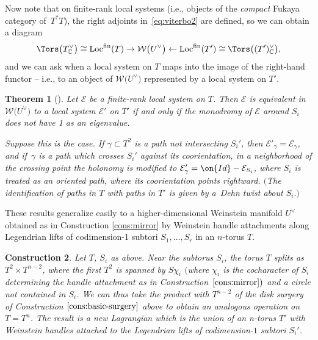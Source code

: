 \documentclass[10pt,a4paper]{amsart}
\numberwithin{equation}{section}
\newtheorem{Theorem}{Theorem}[section]
\newtheorem{Construction}[Theorem]{Construction}
\def\CC{\mathbb{C}}
\def\cW{\mathcal{W}}
\def\cE{\mathcal{E}}
\newcommand\Loc{\textup{Loc}}
\begin{document}
Now note that on finite-rank local systems (i.e., objects of the {\em compact} Fukaya category of~$T^*T$), the right adjoints in~\eqref{eq:viterbo2} are defined, so we can obtain a diagram
\begin{equation}
 \Tors\big(T^\vee_\CC\big)\cong\Loc^{\rm fin}(T)\to \cW\big(U^\vee\big)\gets\Loc^{\rm fin}(T')\cong \Tors\big( (T')^\vee_\CC\big),
\label{eq:viterbo-adj}
\end{equation}
and we can ask when a local system on $T$ maps into the image of the right-hand functor -- i.e., to an object of $\cW\big(U^\vee\big)$ represented by a local system on $T'$.

\begin{Theorem}[{\cite[Theorem 4.16]{STW}}]\label{thm:stw-birational}
 Let $\cE$ be a finite-rank local system on $T$. Then $\cE$ is equivalent in $\cW\big(U^\vee\big)$ to a local system $\cE'$ on $T'$ if and only if the monodromy of $\cE$ around $S_i$ does not have 1 as an eigenvalue.

 Suppose this is the case. If $\gamma\subset T^2$ is a path not intersecting $S_i'$, then $\cE'_\gamma=\cE_\gamma$, and if~$\gamma$ is a path which crosses $S_i'$ against its coorientation, in a neighborhood of the crossing point the holonomy is modified to $\cE'_\gamma = \on{Id}-\cE_{S_i}$, where $S_i$ is treated as an oriented path, where its coorientation points rightward. $($The identification of paths in $T$ with paths in $T'$ is given by a~Dehn twist about $S_i.)$
\end{Theorem}

These results generalize easily to a higher-dimensional Weinstein manifold $U^\vee$ obtained as in Construction \ref{cons:mirror} by Weinstein handle attachments along Legendrian lifts of codimension-1 subtori $S_1,\dots,S_r$ in an $n$-torus $T$.

\begin{Construction}\label{cons:basic-surgery-highd}
 Let $T$, $S_i$ as above. Near the subtorus $S_i$, the torus $T$ splits as $T^2\times T^{n-2}$, where the first $T^2$ is spanned by $S{\chi_i}$ $($where $\chi_i$ is the cocharacter of $S_i$ determining the handle attachment as in Construction~$\ref{cons:mirror})$ and a circle not contained in $S_i$.
We can thus take the product with $T^{n-2}$ of the disk surgery of Construction $\ref{cons:basic-surgery}$ above to obtain an analogous operation on $T=T^n$. The result is a new Lagrangian which is the union of an n-torus $T'$ with Weinstein handles attached to the Legendrian lifts of codimension-$1$ subtori $S_i'$.
\end{Construction}
\end{document}
